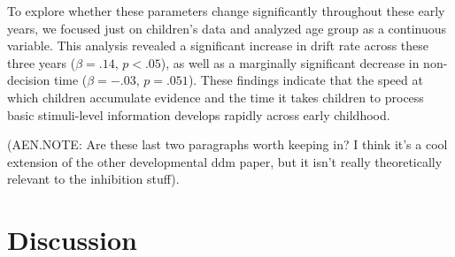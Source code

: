 \documentclass[10pt,letterpaper]{article}
\begin{document}
To explore whether these parameters change significantly throughout these early years, we focused just on children's data and analyzed age group as a continuous variable.  This analysis revealed a significant increase in drift rate across these three years ($\beta = .14$, $p < .05$), as well as a marginally significant decrease in non-decision time ($\beta = -.03$, $p = .051$).  These findings indicate that the speed at which children accumulate evidence and the time it takes children to process basic stimuli-level information develops rapidly across early childhood.  

(AEN.NOTE: Are these last two paragraphs worth keeping in?  I think it's a cool extension of the other developmental ddm paper, but it isn't really theoretically relevant to the inhibition stuff).  




\section{Discussion}

%



\setlength{\bibleftmargin}{.125in}
\setlength{\bibindent}{-\bibleftmargin}


\end{document}
